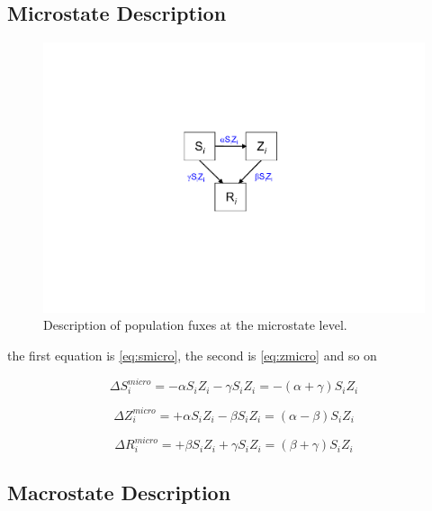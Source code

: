 \documentclass[11pt]{article} %
\begin{document}
\subsection{Microstate Description}\indent

\begin{figure}[h!]
\centerline{
\includegraphics[scale=0.55]{Images/microstate.pdf}}
\caption{Description of population fuxes at the microstate level. \label{microstate} }
\end{figure}

the first equation is \eqref{eq:smicro}, the second is \eqref{eq:zmicro} and so on


\begin{equation}  \label{eq:smicro}
\Delta S_{i}^{micro} = -\alpha S_{i} Z_{i} -\gamma S_{i} Z_{i} = -(\alpha + \gamma) S_{i} Z_{i}
\end{equation}

\begin{equation} \label{eq:zmicro}
\Delta Z_{i}^{micro} = +\alpha S_{i} Z_{i} - \beta S_{i} Z_{i} = (\alpha - \beta) S_{i} Z_{i}
\end{equation}

\begin{equation} \label{eq:rmicro}
\Delta R_{i}^{micro} = +\beta S_{i} Z_{i} + \gamma S_{i} Z_{i} = (\beta + \gamma) S_{i} Z_{i}
\end{equation}


\subsection{Macrostate Description}\indent
\end{document}
